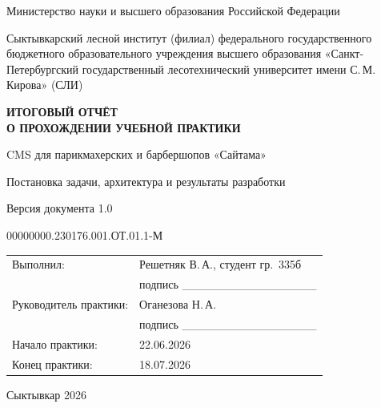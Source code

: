 



\begin{titlepage}
\centering
\vspace*{1cm}
{\large Министерство науки и высшего образования Российской Федерации\par}
\vspace{1.2em}
{\large Сыктывкарский лесной институт (филиал) федерального государственного
бюджетного образовательного учреждения высшего образования
«Санкт-Петербургский государственный лесотехнический университет
имени С.\,М.\,Кирова» (СЛИ)\par}
\vspace{1.5cm}
{\Large\bfseries ИТОГОВЫЙ ОТЧЁТ\\[2pt]О ПРОХОЖДЕНИИ УЧЕБНОЙ ПРАКТИКИ\par}
\vspace{1em}
{\large CMS для парикмахерских и барбершопов «Сайтама»\par}
\vspace{0.3em}
{\large Постановка задачи, архитектура и результаты разработки\par}
\vspace{0.3em}
{\large Версия документа 1.0\par}
\vspace{0.8em}
00000000.230176.001.ОТ.01.1-М\par
\vfill
\begin{tabular}{@{}p{5.5cm}p{7.5cm}@{}}
Выполнил: & Решетняк В.\,А., студент гр.\ 335б \\[2pt]
            & подпись \_\_\_\_\_\_\_\_\_\_\_\_\_\_\_\_ \\[14pt]
Руководитель практики: & Оганезова Н.\,А. \\[2pt]
            & подпись \_\_\_\_\_\_\_\_\_\_\_\_\_\_\_\_ \\[14pt]
Начало практики: & 22.06.2026 \\[2pt]
Конец практики: & 18.07.2026 \\
\end{tabular}
\vfill
Сыктывкар 2026\par
\vspace{1cm}
\end{titlepage}

